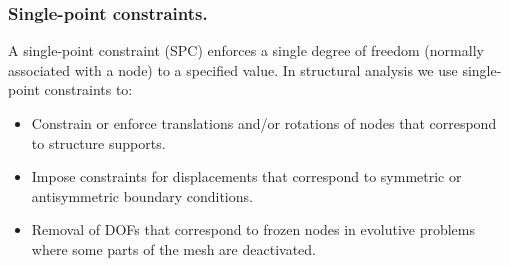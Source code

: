 \subsubsection{Single-point constraints.} \label{sc_sp_constraints}
A single-point constraint (SPC) enforces a single degree of freedom (normally associated with a node) to a specified value. In structural analysis we use single-point constraints to:

\begin{itemize}
  \item Constrain or enforce translations and/or rotations of nodes that correspond to structure supports.
  \item Impose constraints for displacements that correspond to symmetric or antisymmetric boundary conditions.
  \item Removal of DOFs that correspond to frozen nodes in evolutive problems where some parts of the mesh are deactivated.
\end{itemize}
